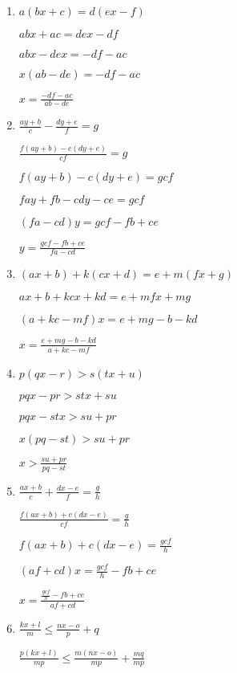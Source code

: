 \documentclass[10pt]{exam}
\begin{document}
\begin{multicols*}{2}
\begin{enumerate}
\item \( a(bx + c) = d(ex - f) \)

\( abx + ac = dex - df \)

\( abx - dex = -df - ac \)

\( x(ab - de) = -df - ac \)

\(\displaystyle x = \frac{-df - ac}{ab - de} \)

\item \(\displaystyle \frac{ay + b}{c} - \frac{dy + e}{f} = g \)

\(\displaystyle \frac{f(ay + b) - c(dy + e)}{cf} = g \)

\( f(ay + b) - c(dy + e) = gcf \)

\( fay + fb - cdy - ce = gcf \)

\( (fa - cd)y = gcf - fb + ce \)

\(\displaystyle y = \frac{gcf - fb + ce}{fa - cd} \)

\item \( (ax + b) + k(cx + d) = e + m(fx + g) \)

\( ax + b + kcx + kd = e + mfx + mg \)

\( (a + kc - mf)x = e + mg - b - kd \)

\(\displaystyle x = \frac{e + mg - b - kd}{a + kc - mf} \)

\item \( p(qx - r) > s(tx + u) \)

\( pqx - pr > stx + su \)

\( pqx - stx > su + pr \)

\( x(pq - st) > su + pr \)

\(\displaystyle x > \frac{su + pr}{pq - st} \)

\item \(\displaystyle \frac{ax + b}{c} + \frac{dx - e}{f} = \frac{g}{h} \)

\(\displaystyle \frac{f(ax + b) + c(dx - e)}{cf} = \frac{g}{h} \)

\(\displaystyle f(ax + b) + c(dx - e) = \frac{gcf}{h} \)

\(\displaystyle (af + cd)x = \frac{gcf}{h} - fb + ce \)

\(\displaystyle x = \frac{\frac{gcf}{h} - fb + ce}{af + cd} \)

\item \(\displaystyle \frac{kx + l}{m} \leq \frac{nx - o}{p} + q \)

\(\displaystyle \frac{p(kx + l)}{mp} \leq \frac{m(nx - o)}{mp} + \frac{mq}{mp} \)


\end{enumerate}
\end{multicols*}
\end{document}

